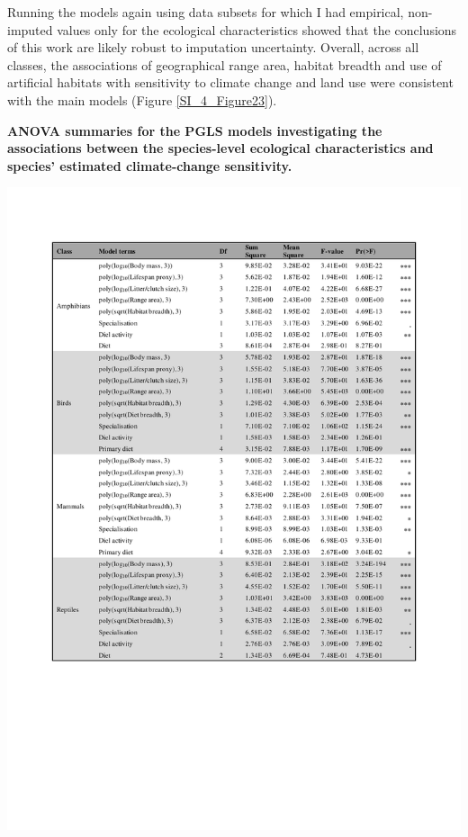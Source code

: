 
Running the models again using data subsets for which I had empirical, non-imputed values only for the ecological characteristics showed that the conclusions of this work are likely robust to imputation uncertainty. Overall, across all classes, the associations of geographical range area, habitat breadth and use of artificial habitats with sensitivity to climate change and land use were consistent with the main models (Figure \ref{SI_4_Figure23}).


\clearpage


\begin{table}[h!]
\centering
\caption[ANOVA summaries for the PGLS models investigating the associations between the species-level ecological characteristics and species' estimated climate-change sensitivity.]{\textbf{ANOVA summaries for the PGLS models investigating the associations between the species-level ecological characteristics and species' estimated climate-change sensitivity.}}
\includegraphics[scale=1, trim={2cm 5 1 2cm}, clip]{figures/Chapter4/Table_ANOVA_PGLS_pdf}
\label{chap4_table2}
\end{table}



